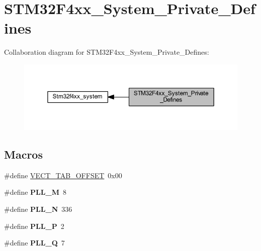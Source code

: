 \hypertarget{group___s_t_m32_f4xx___system___private___defines}{}\section{S\+T\+M32\+F4xx\+\_\+\+System\+\_\+\+Private\+\_\+\+Defines}
\label{group___s_t_m32_f4xx___system___private___defines}
Collaboration diagram for S\+T\+M32\+F4xx\+\_\+\+System\+\_\+\+Private\+\_\+\+Defines\+:
\nopagebreak
\begin{figure}[H]
\begin{center}
\leavevmode
\includegraphics[width=350pt]{group___s_t_m32_f4xx___system___private___defines}
\end{center}
\end{figure}
\subsection*{Macros}
\begin{DoxyCompactItemize}
\item 
\#define \hyperlink{group___s_t_m32_f4xx___system___private___defines_ga40e1495541cbb4acbe3f1819bd87a9fe}{V\+E\+C\+T\+\_\+\+T\+A\+B\+\_\+\+O\+F\+F\+S\+ET}~0x00
\item 
\mbox{\label{group___s_t_m32_f4xx___system___private___defines_ga0fa5a868f5cd056a04b1c42e454b9617}} 
\#define {\bfseries P\+L\+L\+\_\+M}~8
\item 
\mbox{\label{group___s_t_m32_f4xx___system___private___defines_ga04586ea638d21afe558db4f2798c38a6}} 
\#define {\bfseries P\+L\+L\+\_\+N}~336
\item 
\mbox{\label{group___s_t_m32_f4xx___system___private___defines_ga290dcd27167e925d817e8334111c1c01}} 
\#define {\bfseries P\+L\+L\+\_\+P}~2
\item 
\mbox{\label{group___s_t_m32_f4xx___system___private___defines_gac958257ddb2537c539cffdb3a4543067}} 
\#define {\bfseries P\+L\+L\+\_\+Q}~7
\end{DoxyCompactItemize}



